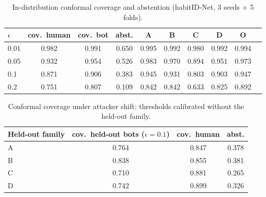 \begin{table}[t]
\caption{In-distribution conformal coverage and abstention (habitID-Net, 3 seeds $\times$ 5 folds).}
\label{tab:conf}
\centering
\small
\begin{tabular}{lccccccccc}
\toprule
$\epsilon$ & cov.\ human & cov.\ bot & abst. & A & B & C & D & O \\
\midrule
0.01 & 0.982 & 0.991 & 0.650 & 0.995 & 0.992 & 0.980 & 0.992 & 0.994 \\
0.05 & 0.932 & 0.954 & 0.526 & 0.983 & 0.970 & 0.894 & 0.951 & 0.973 \\
0.1 & 0.871 & 0.906 & 0.383 & 0.945 & 0.931 & 0.803 & 0.903 & 0.947 \\
0.2 & 0.751 & 0.807 & 0.109 & 0.842 & 0.842 & 0.633 & 0.825 & 0.892 \\
\bottomrule
\end{tabular}
\end{table}

\begin{table}[t]
\caption{Conformal coverage under attacker shift: thresholds calibrated without the held-out family.}
\label{tab:conflofo}
\centering
\small
\begin{tabular}{lccc}
\toprule
Held-out family & cov.\ held-out bots ($\epsilon{=}0.1$) & cov.\ human & abst. \\
\midrule
A & 0.764 & 0.847 & 0.378 \\
B & 0.838 & 0.855 & 0.381 \\
C & 0.710 & 0.881 & 0.265 \\
D & 0.742 & 0.899 & 0.326 \\
\bottomrule
\end{tabular}
\end{table}
